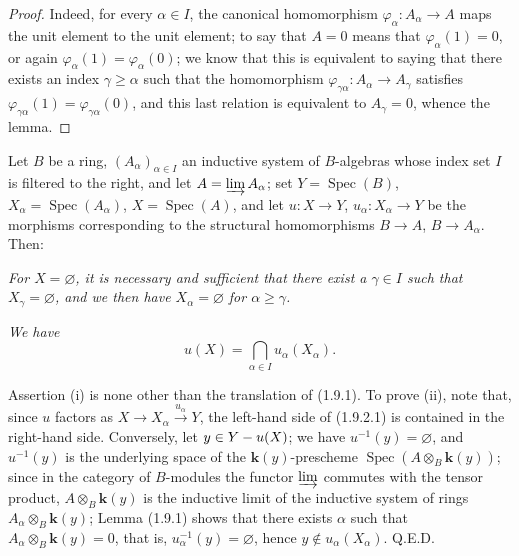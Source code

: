 \begin{proof}
Indeed, for every $\alpha\in I$, the canonical homomorphism
$\varphi_\alpha:A_\alpha\to A$ maps the unit element to the unit element;
to say that $A=0$ means that $\varphi_\alpha(1)=0$, or again
$\varphi_\alpha(1)=\varphi_\alpha(0)$; we know that this is equivalent to
saying that there exists an index $\gamma\geq\alpha$ such that the
homomorphism $\varphi_{\gamma\alpha}:A_\alpha\to A_\gamma$ satisfies
$\varphi_{\gamma\alpha}(1)=\varphi_{\gamma\alpha}(0)$, and this last
relation is equivalent to $A_\gamma=0$, whence the lemma.
\end{proof}

\begin{proposition}[1.9.2]
\label{IV.1.9.2}
Let $B$ be a ring, $(A_\alpha)_{\alpha\in I}$ an inductive system of
$B$-algebras whose index set $I$ is filtered to the right, and let
$A=\varinjlim A_\alpha$; set $Y=\operatorname{Spec}(B)$,
$X_\alpha=\operatorname{Spec}(A_\alpha)$, $X=\operatorname{Spec}(A)$, and
let $u:X\to Y$, $u_\alpha:X_\alpha\to Y$ be the morphisms corresponding to
the structural homomorphisms $B\to A$, $B\to A_\alpha$. Then:
\end{proposition}

\begin{env}[1.9.2.i]
\label{IV.1.9.2.i}
\emph{For $X=\varnothing$, it is necessary and sufficient that there exist a
$\gamma\in I$ such that $X_\gamma=\varnothing$, and we then have
$X_\alpha=\varnothing$ for $\alpha\geq\gamma$.}
\end{env}


\begin{env}[1.9.2.ii]
\label{IV.1.9.2.ii}
\emph{We have}
\[
  u(X)=\bigcap_{\alpha\in I}u_\alpha(X_\alpha). \tag{1.9.2.1}
  \label{IV.1.9.2.1}
\]
\end{env}

Assertion (i) is none other than the translation of (1.9.1). To prove
(ii), note that, since $u$ factors as
$X\to X_\alpha\xrightarrow{u_\alpha}Y$, the left-hand side of (1.9.2.1) is
contained in the right-hand side. Conversely, let $y\in Y- u(X)$; we have
$u^{-1}(y)=\varnothing$, and $u^{-1}(y)$ is the underlying space of the
$\boldsymbol{k}(y)$-prescheme $\operatorname{Spec}(A\otimes_B\boldsymbol{k}(y))$; since in the
category of $B$-modules the functor $\varinjlim$ commutes with the tensor
product, $A\otimes_B\boldsymbol{k}(y)$ is the inductive limit of the inductive system of
rings $A_\alpha\otimes_B\boldsymbol{k}(y)$; Lemma (1.9.1) shows that there exists $\alpha$
such that $A_\alpha\otimes_B\boldsymbol{k}(y)=0$, that is,
$u_\alpha^{-1}(y)=\varnothing$, hence $y\notin u_\alpha(X_\alpha)$. Q.E.D.

